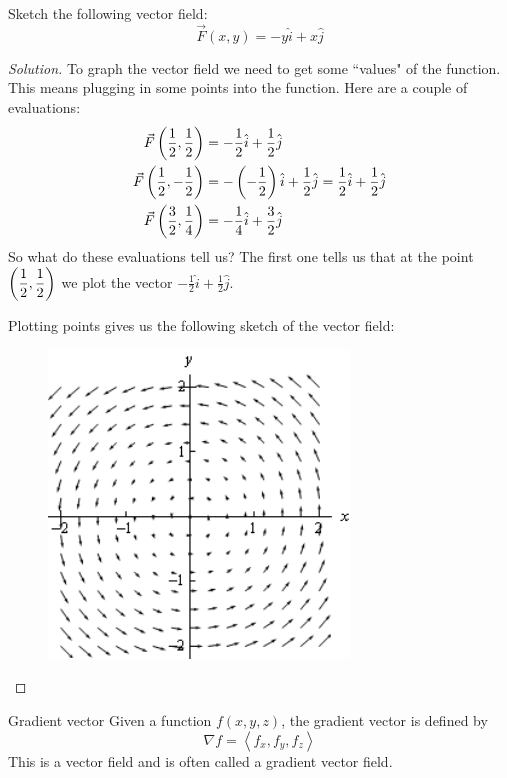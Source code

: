 \begin{exmp}{}{}
Sketch the following vector field:
\[ \vec{F}(x,y) = -y\hat{i} + x\hat{j} \]
\end{exmp}
\begin{proof}[Solution]
To graph the vector field we need to get some ``values" of the function. This means plugging in some points into the function. Here are a couple of evaluations:
\begin{align*}
\vec{F}\left({\frac{1}{2},\frac{1}{2}}\right) &=  -\frac{1}{2}\hat{i} + \frac{1}{2}\hat{j} \\
\vec{F}\left({\frac{1}{2},-\frac{1}{2}}\right) &=  -\left({-\frac{1}{2}}\right)\hat{i} + \frac{1}{2}\hat{j} = \frac{1}{2}\hat{i} + \frac{1}{2}\hat{j} \\
\vec{F}\left({\frac{3}{2},\frac{1}{4}}\right) &=  -\frac{1}{4}\hat{i} + \frac{3}{2}\hat{j}
\end{align*}
So what do these evaluations tell us? The first one tells us that at the point $\left(\dfrac{1}{2},\dfrac{1}{2}\right)$ we plot the vector $-\frac{1}{2}\hat{i} + \frac{1}{2}\hat{j}$.

Plotting points gives us the following sketch of the vector field:

\begin{figure}[H]
    \centering
    \includegraphics[width=8cm]{images/vec_field2.png}
\end{figure}
\end{proof}

\begin{defn}{Gradient vector}{}
Given a function $f(x,y,z)$, the gradient vector is defined by
\begin{equation}
\nabla f = \left\langle {{f_x},{f_y},{f_z}} \right\rangle
\end{equation}
This is a vector field and is often called a gradient vector field.
\end{defn}


